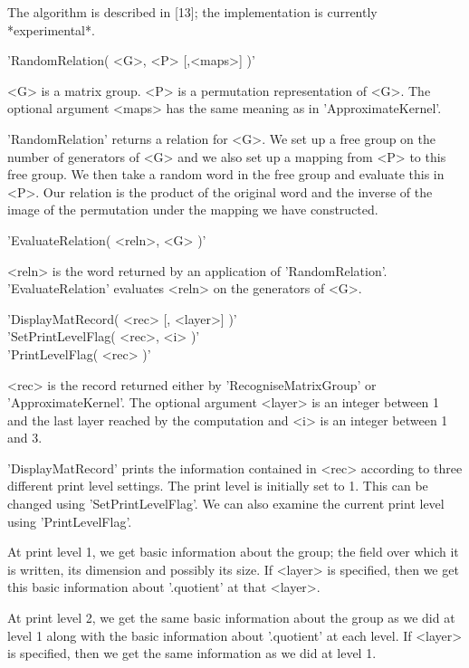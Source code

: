 The    algorithm is described in  [13];   the implementation is currently
*experimental*.

%

'RandomRelation( <G>, <P> [,<maps>] )'

<G> is  a matrix group. <P> is  a permutation representation of  <G>. The
optional argument <maps> has the same meaning as in 'ApproximateKernel'.

'RandomRelation' returns  a relation for <G>. We  set up a free  group on
the number of generators of <G> and we also set up  a mapping from <P> to
this  free group. We  then   take a random word   in  the free group  and
evaluate this  in <P>. Our relation is  the product of the  original word
and the inverse of the image of the permutation under the mapping we have 
constructed.

'EvaluateRelation( <reln>, <G> )'

<reln>   is the  word   returned by  an application  of 'RandomRelation'.
'EvaluateRelation' evaluates <reln> on the generators of <G>.
 
%
%

'DisplayMatRecord( <rec> [, <layer>] )' \\
'SetPrintLevelFlag( <rec>, <i> )' \\
'PrintLevelFlag( <rec> )'

<rec>   is the  record   returned either   by  'RecogniseMatrixGroup'  or
'ApproximateKernel'. The optional argument <layer>  is an integer between
1 and  the last layer  reached by the  computation and <i> is  an integer
between 1 and 3.

'DisplayMatRecord' prints the information contained in <rec> according to
three different print level settings. The print level is initially set to
1. This  can be  changed using  'SetPrintLevelFlag'. We can
also examine the current print level using 'PrintLevelFlag'.

At print level 1,  we get basic information   about the group; the  field
over which it is written, its dimension and possibly its size. If <layer>
is specified, then  we  get this  basic information about  '.quotient' at
that <layer>.

At print level 2, we get the same basic information about the group as we
did at level 1 along with the basic information about '.quotient' at each
level.  If <layer> is  specified, then we get  the same information as we
did at level 1.

